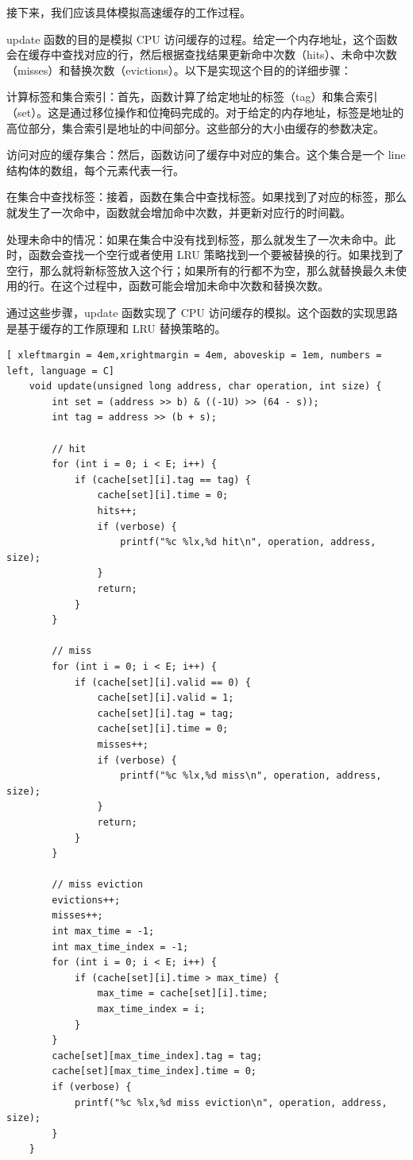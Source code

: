 \documentclass{article}
\begin{document}
接下来，我们应该具体模拟高速缓存的工作过程。

update 函数的目的是模拟 CPU 访问缓存的过程。给定一个内存地址，这个函数会在缓存中查找对应的行，然后根据查找结果更新命中次数（hits）、未命中次数（misses）和替换次数（evictions）。以下是实现这个目的的详细步骤：

计算标签和集合索引：首先，函数计算了给定地址的标签（tag）和集合索引（set）。这是通过移位操作和位掩码完成的。对于给定的内存地址，标签是地址的高位部分，集合索引是地址的中间部分。这些部分的大小由缓存的参数决定。

访问对应的缓存集合：然后，函数访问了缓存中对应的集合。这个集合是一个 line 结构体的数组，每个元素代表一行。

在集合中查找标签：接着，函数在集合中查找标签。如果找到了对应的标签，那么就发生了一次命中，函数就会增加命中次数，并更新对应行的时间戳。

处理未命中的情况：如果在集合中没有找到标签，那么就发生了一次未命中。此时，函数会查找一个空行或者使用 LRU 策略找到一个要被替换的行。如果找到了空行，那么就将新标签放入这个行；如果所有的行都不为空，那么就替换最久未使用的行。在这个过程中，函数可能会增加未命中次数和替换次数。

通过这些步骤，update 函数实现了 CPU 访问缓存的模拟。这个函数的实现思路是基于缓存的工作原理和 LRU 替换策略的。

\begin{lstlisting}[ xleftmargin = 4em,xrightmargin = 4em, aboveskip = 1em, numbers = left, language = C]
    void update(unsigned long address, char operation, int size) {
        int set = (address >> b) & ((-1U) >> (64 - s));
        int tag = address >> (b + s);
    
        // hit
        for (int i = 0; i < E; i++) {
            if (cache[set][i].tag == tag) {
                cache[set][i].time = 0;
                hits++;
                if (verbose) {
                    printf("%c %lx,%d hit\n", operation, address, size);
                }
                return;
            }
        }
    
        // miss
        for (int i = 0; i < E; i++) {
            if (cache[set][i].valid == 0) {
                cache[set][i].valid = 1;
                cache[set][i].tag = tag;
                cache[set][i].time = 0;
                misses++;
                if (verbose) {
                    printf("%c %lx,%d miss\n", operation, address, size);
                }
                return;
            }
        }
    
        // miss eviction
        evictions++;
        misses++;
        int max_time = -1;
        int max_time_index = -1;
        for (int i = 0; i < E; i++) {
            if (cache[set][i].time > max_time) {
                max_time = cache[set][i].time;
                max_time_index = i;
            }
        }
        cache[set][max_time_index].tag = tag;
        cache[set][max_time_index].time = 0;
        if (verbose) {
            printf("%c %lx,%d miss eviction\n", operation, address, size);
        }
    }
\end{lstlisting}
\end{document}
